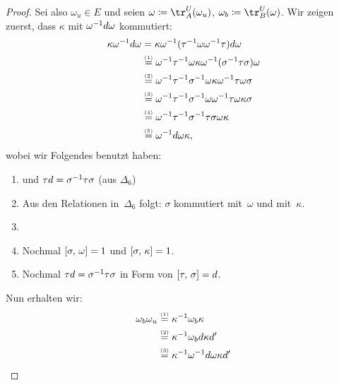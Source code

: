 \begin{proof}
    Sei also $\omega_u\in E$ und seien $\omega\defeq\tr^U_A(\omega_u)$,
    $\omega_b\defeq\tr^U_B(\omega)$. Wir zeigen zuerst, dass
    $\kappa$ mit $\omega^{-1} d\omega$ kommutiert:
    \begin{align*}
        \kappa\omega^{-1} d\omega
        &=
        \kappa\omega^{-1} (\tau^{-1}\omega\omega^{-1}\tau) d\omega
        \\
        &\overset{\scriptscriptstyle(1)}=
        \omega^{-1}\tau^{-1}\omega\kappa \omega^{-1}
            (\sigma^{-1}\tau\sigma)\omega
        \\
        &\overset{\scriptscriptstyle(2)}=
        \omega^{-1}\tau^{-1}\sigma^{-1}
            \omega\kappa \omega^{-1}\tau\omega\sigma
        \\
        &\overset{\scriptscriptstyle(3)}=
        \omega^{-1}\tau^{-1}\sigma^{-1}
            \omega\omega^{-1}\tau\omega\kappa\sigma
        \\
        &\overset{\scriptscriptstyle(4)}=
        \omega^{-1}\tau^{-1}\sigma^{-1}\tau\sigma\omega\kappa
        \\
        &\overset{\scriptscriptstyle(5)}=
        \omega^{-1} d\omega\kappa
    , \end{align*}
    wobei wir Folgendes benutzt haben:
    \begin{enumerate}[(1), itemsep=0pt, topsep=0.5\baselineskip]
        \item
             und $\tau d =
            \sigma^{-1}\tau\sigma$ (aus $\Delta_6$)
        \item
            Aus den Relationen in~$\Delta_6$ folgt: $\sigma$ kommutiert
            mit~$\omega$ und mit~$\kappa$.
        \item
        \item
            Nochmal $\cu[\sigma, \omega] = 1$
            und $\cu[\sigma, \kappa] = 1$.
        \item
            Nochmal $\tau d = \sigma^{-1}\tau\sigma$ in Form von
            $\cu[\tau, \sigma] = d$.
    \end{enumerate}
    Nun erhalten wir:
    \begin{align*}
        \omega_b\omega_u
        &\overset{\scriptscriptstyle(1)}=
        \kappa\inv\omega_b\kappa
        \\
        &\overset{\scriptscriptstyle(2)}=
        \kappa\inv\omega_b d\kappa d'
        \\
        &\overset{\scriptscriptstyle(3)}=
        \kappa\inv \omega\inv d\omega \kappa d'

\end{align*}
\end{proof}
